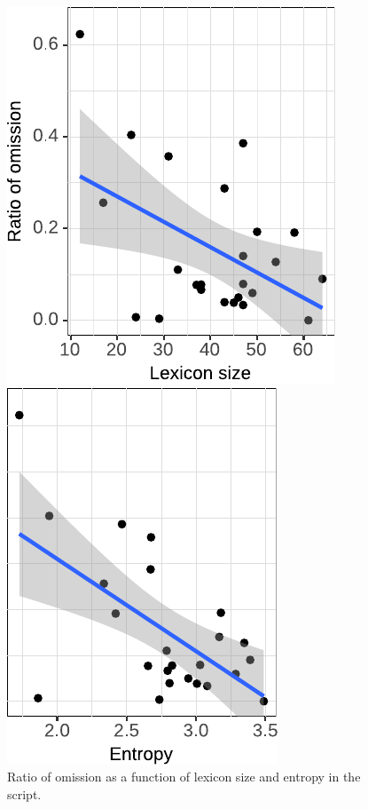 \begin{figure}
\begin{minipage}{.5\textwidth}\centering
  \includegraphics{figures/scr_production_omission_ratio_lexicon}
\end{minipage}%
\begin{minipage}{.5\textwidth}\centering
  \includegraphics{figures/scr_production_omission_ratio_entropy}
\end{minipage}
 \caption{Ratio of omission as a function of lexicon size and entropy in the script.\label{fig:scripts-ellratio-lexicon}}
\end{figure}

